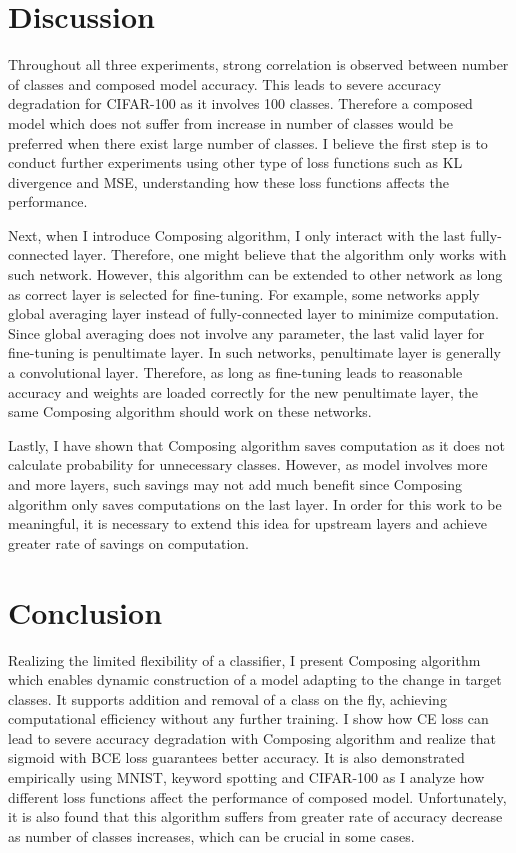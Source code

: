 \documentclass{article}
\begin{document}
\section{Discussion}

Throughout all three experiments, strong correlation is observed between number of classes and composed model accuracy. This leads to severe accuracy degradation for CIFAR-100 as it involves 100 classes. Therefore a composed model which does not suffer from increase in number of classes would be preferred when there exist large number of classes. I believe the first step is to conduct further experiments using other type of loss functions such as KL divergence and MSE, understanding how these loss functions affects the performance.

Next, when I introduce Composing algorithm, I only interact with the last fully-connected layer. Therefore, one might believe that the algorithm only works with such network. However, this algorithm can be extended to other network as long as correct layer is selected for fine-tuning. For example, some networks apply global averaging layer instead of fully-connected layer to minimize computation. Since global averaging does not involve any parameter, the last valid layer for fine-tuning is penultimate layer. In such networks, penultimate layer is generally a convolutional layer. Therefore, as long as fine-tuning leads to reasonable accuracy and weights are loaded correctly for the new penultimate layer, the same Composing algorithm should work on these networks.

Lastly, I have shown that Composing algorithm saves computation as it does not calculate probability for unnecessary classes. However, as model involves more and more layers, such savings may not add much benefit since Composing algorithm only saves computations on the last layer. In order for this work to be meaningful, it is necessary to extend this idea for upstream layers and achieve greater rate of savings on computation.

\section{Conclusion}

Realizing the limited flexibility of a classifier, I present Composing algorithm which enables dynamic construction of a model adapting to the change in target classes. It supports addition and removal of a class on the fly, achieving computational efficiency without any further training. I show how CE loss can lead to severe accuracy degradation with Composing algorithm and realize that sigmoid with BCE loss guarantees better accuracy. It is also demonstrated empirically using MNIST, keyword spotting and CIFAR-100 as I analyze how different loss functions affect the performance of composed model. Unfortunately, it is also found that this algorithm suffers from greater rate of accuracy decrease as number of classes increases, which can be crucial in some cases.

\newpage

\nocite{*}



\end{document}
